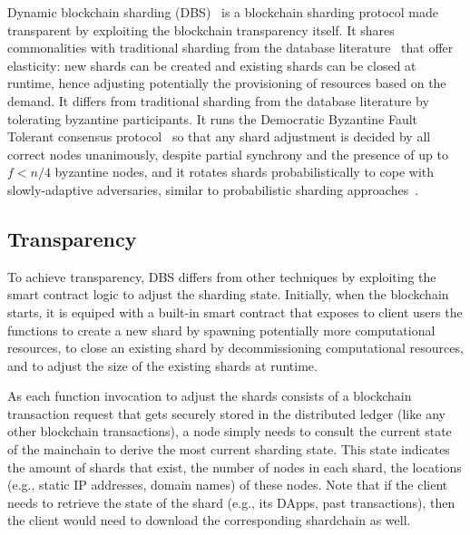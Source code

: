 \documentclass[11pt,dvipdfm]{article}
\newcommand{\deepal}[1]{\emph{Deepal: #1}}%
\begin{document}
Dynamic blockchain sharding (DBS)~\cite{TG22} is a blockchain sharding protocol made transparent by exploiting the blockchain transparency itself. 
It shares commonalities with traditional sharding from the database literature~\cite{SMA14,TMS14,AMH16,10.1145/3477132.3483552}
that offer elasticity:
new shards can be created and existing shards can be closed at runtime, hence adjusting potentially the 
provisioning of resources based on the demand.
It differs from traditional sharding from the database literature by tolerating byzantine participants.
It runs the Democratic Byzantine Fault Tolerant consensus protocol~\cite{CGLR18} so that any 
shard adjustment is decided by all correct nodes unanimously, despite partial synchrony and the presence of up to 
$f<n/4$ byzantine nodes, and it rotates shards probabilistically to cope with slowly-adaptive adversaries, similar to probabilistic sharding approaches~\cite{KJGG17,LNZ16,ZMR18,Eth2}.

\subsection{Transparency}\label{sec:transparency}
To achieve transparency, DBS differs from other techniques by exploiting the smart contract logic to adjust the sharding state. Initially, when the blockchain starts, it is equiped with 
a built-in smart contract that exposes to client users the functions to create a new shard by spawning potentially 
more computational resources, to close an existing shard by decommissioning computational resources, 
and to adjust the size of the existing shards at runtime. 

As each function invocation to adjust the shards consists of a blockchain transaction request 
that gets securely stored in the distributed ledger (like any other blockchain transactions), a node 
simply needs to consult the current state of the mainchain to derive the most current sharding state. 
This state indicates the amount of shards that exist, the number of nodes in each shard, the locations (e.g., static IP addresses, domain names) of these nodes.
Note that if the client needs to retrieve the state of the shard (e.g., its DApps, past transactions), then the client would need to download the corresponding shardchain as well.
\end{document}
